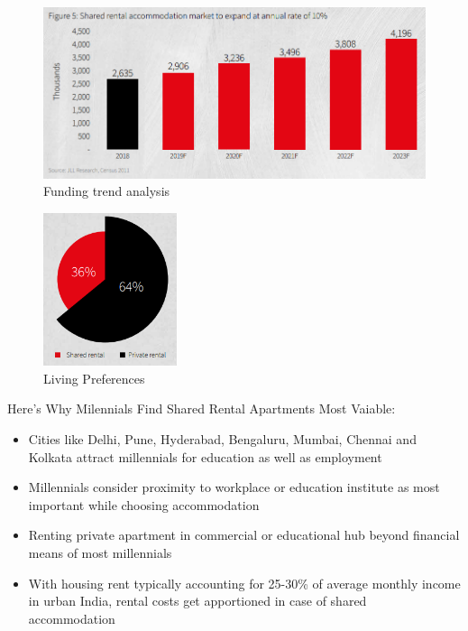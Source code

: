 \clearpage
\begin{figure}[h]
      \centering
      \includegraphics[width=1\textwidth]{Images/shared_market_trends.png}
      \caption{Funding trend analysis}
\end{figure}

\begin{figure}
      \centering
      \includegraphics[width=0.35\textwidth]{Images/shared_pref.png}
      \caption{Living Preferences}
\end{figure}

Here's Why Milennials Find Shared Rental Apartments Most Vaiable:
\begin{itemize}
      \item Cities like Delhi, Pune, Hyderabad, Bengaluru, Mumbai, Chennai and Kolkata attract
            millennials for education as well as employment
      \item  Millennials consider proximity to workplace or education institute as most important while
            choosing accommodation
      \item Renting private apartment in commercial or educational hub beyond financial means of
            most millennials
      \item With housing rent typically accounting for 25-30\% of average monthly income in urban
            India, rental costs get apportioned in case of shared accommodation~\cite{coliving-reshaping-rental-housing-in-india}
\end{itemize}
